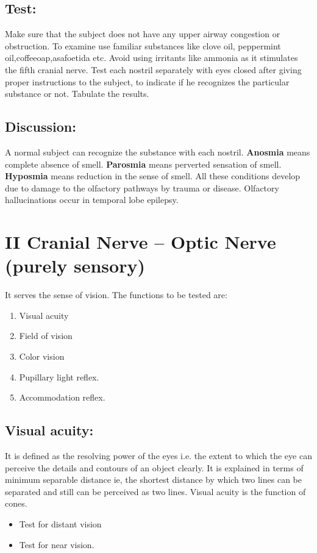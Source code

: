 \documentclass[a4paper,12pt,openany,twoside]{book}
\begin{document}
\subsection*{Test:}
Make sure that the subject does not have any upper airway congestion or obstruction. To examine use familiar substances like clove oil, peppermint oil,coffeeoap,asafoetida etc. Avoid using irritants like ammonia as it stimulates the fifth cranial nerve.
Test each nostril separately with eyes closed after giving proper instructions to the subject, to indicate if he recognizes the particular substance or not. Tabulate the results.
\subsection*{Discussion:}
A normal subject can recognize the substance with each nostril.
	\textbf{Anosmia} means complete absence of smell. \textbf{Parosmia} means perverted sensation of smell. \textbf{Hyposmia} means reduction in the sense of smell. All these conditions develop due to damage to the olfactory pathways by trauma or disease. Olfactory hallucinations occur in temporal lobe epilepsy.

		\section*{II Cranial Nerve – Optic Nerve (purely sensory)}
		It serves the sense of vision. The functions to be tested are:
		\begin{enumerate}
\item{Visual acuity}
\item{Field of vision}
\item{Color vision}
\item{Pupillary light reflex.}
\item{Accommodation reflex.}
		\end{enumerate}
		\subsection*{Visual acuity:}
		It is defined as the resolving power of the eyes i.e. the extent to which the eye can perceive the details and contours of an object clearly. It is explained in terms of minimum separable distance ie, the shortest distance by which two lines can be separated and still can be perceived as two lines. Visual acuity is the function of cones.
		\begin{itemize}
			\item[]Test for distant vision
			\item[]Test for near vision.
		\end{itemize}
\end{document}
